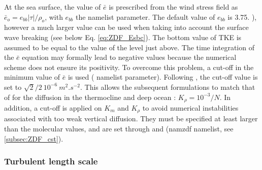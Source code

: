 \documentclass[../main/NEMO_manual]{subfiles}
\begin{document}
At the sea surface, the value of $\bar{e}$ is prescribed from the wind stress field as
$\bar{e}_o = e_{bb} |\tau| / \rho_o$, with $e_{bb}$ the  namelist parameter.
The default value of $e_{bb}$ is 3.75. \citep{Gaspar1990}), however a much larger value can be used when
taking into account the surface wave breaking (see below Eq. \autoref{eq:ZDF_Esbc}).
The bottom value of TKE is assumed to be equal to the value of the level just above.
The time integration of the $\bar{e}$ equation may formally lead to negative values because
the numerical scheme does not ensure its positivity.
To overcome this problem, a cut-off in the minimum value of $\bar{e}$ is used ( namelist parameter).
Following \citet{Gaspar1990}, the cut-off value is set to $\sqrt{2}/2~10^{-6}~m^2.s^{-2}$.
This allows the subsequent formulations to match that of \citet{Gargett1984} for the diffusion in
the thermocline and deep ocean :  $K_\rho = 10^{-3} / N$.
In addition, a cut-off is applied on $K_m$ and $K_\rho$ to avoid numerical instabilities associated with
too weak vertical diffusion.
They must be specified at least larger than the molecular values, and are set through  and
 (namzdf namelist, see \autoref{subsec:ZDF_cst}).

\subsubsection{Turbulent length scale}
\end{document}
